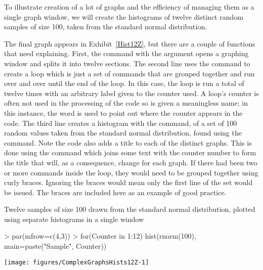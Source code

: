To illustrate creation of a lot of graphs and the efficiency of managing them as a single graph window, we will create the histograms of twelve distinct random samples of size 100, taken from the standard normal distribution. 
 
The final graph appears in Exhibit~\ref{Hist12Z}, but there are a couple of functions that need explaining. First, the  command with the  argument opens a graphing window and splits it into twelve sections. The second line uses the  command to create a loop which is just a set of commands that are grouped together and run over and over until the end of the loop. In this case, the loop is run a total of twelve times with an arbitrary label given to the counter used. A loop's counter is often not used in the processing of the code so is given a meaningless name; in this instance, the word  is used to point out where the counter appears in the code. The third line creates a histogram with the  command, of a set of 100 random values taken from the standard normal distribution, found using the  command. Note the code also adds a title to each of the distinct graphs. This is done using the  command which joins some text with the counter number to form the title that will, as a consequence, change for each graph. If there had been two or more commands inside the loop, they would need to be grouped together using curly braces. Ignoring the braces would mean only the first line of the set would be issued. The braces are included here as an example of good practice. 
 
\begin{exhibit} 
\begin{center} 
\caption{Twelve samples of size 100 drawn from the standard normal distribution, plotted using separate histograms in a single window} 
\label{Hist12Z}

\begin{Schunk}
\begin{Sinput}
> par(mfrow=c(4,3)) 
> for(Counter in 1:12){ 
   hist(rnorm(100), main=paste("Sample", Counter))} 
\end{Sinput}

\texttt{[image: figures/ComplexGraphsHists12Z-1]} \end{Schunk}



\end{center} 
\end{exhibit} 
 
